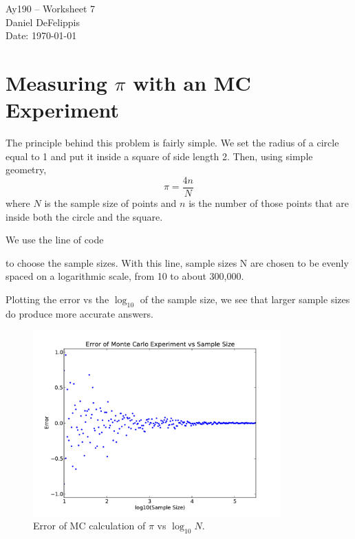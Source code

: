 \documentclass[11pt,letterpaper]{article}
\begin{document}
\begin{center}
\Large
Ay190 -- Worksheet 7\\
Daniel DeFelippis\\
Date: \today
\end{center}


\section{Measuring $\pi$ with an MC Experiment}

The principle behind this problem is fairly simple. We set the radius of a circle
equal to 1 and put it inside a square of side length 2. Then, using simple geometry,
$$ \pi = \frac{4n}{N} $$
where $N$ is the sample size of points and $n$ is the number of those points that
are inside both the circle and the square. 

We use the line of code

to choose the sample sizes. With this line, sample sizes N are chosen to be
evenly spaced on a logarithmic scale, from 10 to about 300,000. 

Plotting the error vs the $\log_{10}$ of the sample size, we see that larger 
sample sizes do produce more accurate answers.

\begin{figure}[bth]
\centering
\includegraphics[width=0.85\textwidth]{pi_err_plot.pdf}
\caption{Error of MC calculation of $\pi$ vs $\log_{10} N$.}
\label{fig:piplot1}
\end{figure}
\end{document}
